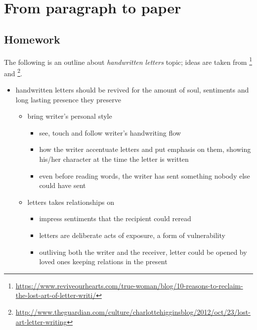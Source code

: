 

\chapter{From paragraph to paper}

\section{Homework}

The following is an outline about \emph{handwritten letters} topic; ideas are taken from 
\footnote{\url{https://www.reviveourhearts.com/true-woman/blog/10-reasons-to-reclaim-the-lost-art-of-letter-writi/}}
and \footnote{\url{http://www.theguardian.com/culture/charlottehigginsblog/2012/oct/23/lost-art-letter-writing}}.

\begin{itemize}
    \item handwritten letters should be revived for the amount of soul, sentiments and
            long lasting presence they preserve

    \begin{itemize}
        
        \item bring writer's personal style

            \begin{itemize}
                \item see, touch and follow writer's handwriting flow
                \item how the writer accentuate letters and put emphasis on them, showing his/her 
                        character at the time the letter is written
                \item even before reading words, the writer has sent something nobody else 
                        could have sent
            \end{itemize}

        \item letters takes relationships on

            \begin{itemize}
                \item impress sentiments that the recipient could reread
                \item letters are deliberate acts of exposure, a form of vulnerability
                \item outliving both the writer and the receiver, letter could
                        be opened by loved ones keeping relations in the present
            \end{itemize}


\end{itemize}
\end{itemize}
